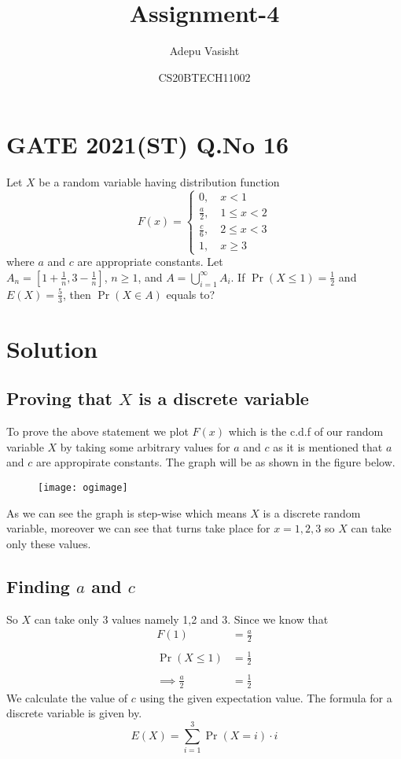 \documentclass[journal,12pt,twocolumn]{IEEEtran}
\title{Assignment-4}
\author{Adepu Vasisht}
\date{CS20BTECH11002}
\providecommand{\brak}[1]{\ensuremath{\left(#1\right)}}
\begin{document}
\maketitle
\section*{GATE 2021(ST) Q.No 16}
Let $X$ be a random variable having distribution function 
\begin{equation}
\nonumber F(x)=
\begin{cases}
0, \quad x<1\\
\frac{a}{2}, \quad  1\leq x<2\\
\frac{c}{6}, \quad 2\leq x<3\\
1, \quad x\geq3
\end{cases}
\end{equation}
where $a$ and $c$ are appropriate constants. Let\\$A_n = \left[1+\frac{1}{n},3-\frac{1}{n}\right]$, $n\geq1$, and $A = \bigcup_{i=1}^{\infty}A_i$. If $\Pr\brak{X\leq1} = \frac{1}{2}$ and $E\brak{X} = \frac{5}{3}$, then $\Pr\brak{X\in A}$ equals to?

\section*{Solution}
\subsection{Proving that $X$ is a discrete variable}
To prove the above statement we plot $F\brak{x}$ which is the c.d.f of our random variable $X$ by taking some arbitrary values for $a$ and $c$ as it is mentioned that $a$ and $c$ are appropirate constants. The graph will be as shown in the figure below. 


\begin{figure}[h]
\texttt{[image: ogimage]}
\end{figure}

As we can see the graph is step-wise which means $X$ is a discrete random variable, moreover we can see that turns take place for $x=1,2,3$ so $X$ can take only these values.
\subsection{Finding $a$ and $c$}

So $X$ can take only 3 values namely 1,2 and 3.
Since we know that 
\begin{align}
 F\brak{1} &= \frac{a}{2}\\
\nonumber \\
 \Pr\brak{X\leq1} &= \frac{1}{2}\\
\nonumber \\
 \implies\frac{a}{2} &= \frac{1}{2}
\end{align}
 We calculate the value of $c$ using the given expectation value. The formula for a discrete variable is given by. 
$$E\brak{X} = \sum_{i=1}^{3}\Pr\brak{X=i}\cdot i$$
\end{document}
